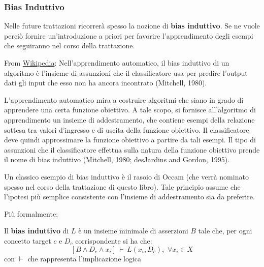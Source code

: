 \subsubsection{Bias Induttivo}
Nelle future trattazioni ricorrerà spesso la nozione di \textbf{bias induttivo}. Se ne vuole perciò fornire un'introduzione a priori per favorire l'apprendimento degli esempi che seguiranno nel corso della trattazione.
\begin{definizione}
  From \href{https://it.wikipedia.org/wiki/Bias_induttivo}{Wikipedia}: Nell'apprendimento automatico, il bias induttivo di un algoritmo è l'insieme di assunzioni che il classificatore usa per predire l'output dati gli input che esso non ha ancora incontrato (Mitchell, 1980).

L'apprendimento automatico mira a costruire algoritmi che siano in grado di apprendere una certa funzione obiettivo. A tale scopo, si fornisce all'algoritmo di apprendimento un insieme di addestramento, che contiene esempi della relazione sottesa tra valori d'ingresso e di uscita della funzione obiettivo. Il classificatore deve quindi approssimare la funzione obiettivo a partire da tali esempi. Il tipo di assunzioni che il classificatore effettua sulla natura della funzione obiettivo prende il nome di bias induttivo (Mitchell, 1980; desJardins and Gordon, 1995).

Un classico esempio di bias induttivo è il rasoio di Occam (che verrà nominato spesso nel corso della trattazione di questo libro). Tale principio assume che l'ipotesi più semplice consistente con l'insieme di addestramento sia da preferire. 
\end{definizione}
Più formalmente:
\begin{definizione} 
  Il \textbf{bias induttivo} di $L$ è un insieme
  minimale di asserzioni $B$ tale 
  che, per ogni concetto target $c$ e $D_c$ corrispondente si ha che:
  \[[B\land D_c\land x_i]\,\vdash\, L(x_i, D_c),\,\,\forall x_i\in X\]
  con $\vdash$ che rappresenta l'implicazione logica
\end{definizione}


